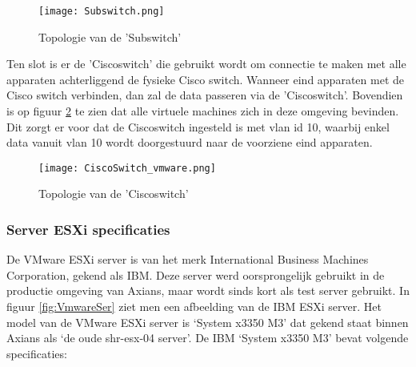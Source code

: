 \begin{figure}[H]
	\centering
	\texttt{[image: Subswitch.png]}
	\caption{Topologie van de 'Sub\textunderscore switch'}
	\label{fig:subswitch}
\end{figure}
\newpage
{}
\newline
Ten slot is er de 'Cisco\textunderscore switch' die gebruikt wordt om connectie te maken met alle apparaten achterliggend de fysieke Cisco switch. Wanneer eind apparaten met de Cisco switch verbinden, dan zal de data passeren via de 'Cisco\textunderscore switch'. Bovendien is op figuur \ref{fig:Ciscoswitch} te zien dat alle virtuele machines zich in deze omgeving bevinden. Dit zorgt er voor dat de Cisco\textunderscore switch ingesteld is met vlan id 10, waarbij enkel data vanuit vlan 10 wordt doorgestuurd naar de voorziene eind apparaten.

\begin{figure}[H]
	\centering
	\texttt{[image: CiscoSwitch\_vmware.png]}
	\caption{Topologie van de 'Cisco\textunderscore switch'}
	\label{fig:Ciscoswitch}
\end{figure}

\subsubsection{Server ESXi specificaties}
De VMware ESXi server is van het merk International Business Machines Corporation, gekend als IBM. Deze server werd oorsprongelijk gebruikt in de productie omgeving van Axians, maar wordt sinds kort als test server gebruikt. In figuur \ref{fig:VmwareSer} ziet men een afbeelding van de IBM ESXi server.
\newline
\newline
Het model van de VMware ESXi server is ‘System x3350 M3’ dat gekend staat binnen Axians als ‘de oude shr-esx-04 server’. De IBM ‘System x3350 M3’ bevat volgende specificaties:

